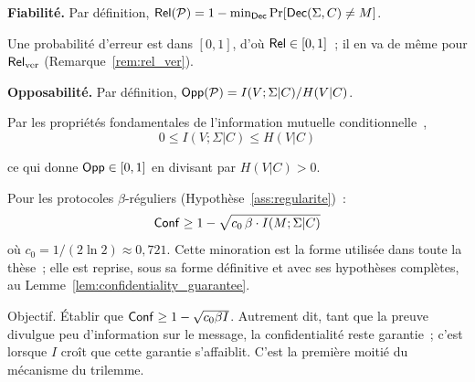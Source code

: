 \begin{sloppypar}
\begin{Preuve}
\textbf{Fiabilit\'e.}
Par d\'efinition, $\mathsf{Rel}(\mathcal{P}) = 1 - \min_{\mathsf{Dec}} \Pr[\mathsf{Dec}(\Sigma,C) \neq M]$.

Une probabilit\'e d'erreur est dans $[0,1]$, d'o\`u $\mathsf{Rel} \in [0,1]$~; il en va
de m\^eme pour $\mathsf{Rel}_{\mathrm{ver}}$ (Remarque~\ref{rem:rel_ver}).

\textbf{Opposabilit\'e.}
Par d\'efinition, $\mathsf{Opp}(\mathcal{P}) = I(V;\Sigma|C)/H(V|C)$.

Par les propri\'et\'es fondamentales de l'information mutuelle
conditionnelle~\cite{CoverThomas06},
\begin{equation}
0 \leq I(V;\Sigma|C) \leq H(V|C)
\end{equation}

ce qui donne $\mathsf{Opp} \in [0,1]$ en divisant par $H(V|C) > 0$.
\end{Preuve}
\begin{lemma}\label{lem:compromis_conf_mi}
Pour les protocoles $\beta$-r\'eguliers (Hypoth\`ese~\ref{ass:regularite})~:
\begin{equation}
\mathsf{Conf} \geq 1 - \sqrt{c_0\,\beta \cdot I(M;\Sigma|C)}
\label{eq:compromis_conf_mi}
\end{equation}
o\`u $c_0 = 1/(2\ln 2) \approx 0{,}721$. Cette minoration est la forme
utilis\'ee dans toute la th\`ese~; elle est reprise, sous sa forme
d\'efinitive et avec ses hypoth\`eses compl\`etes, au
Lemme~\ref{lem:confidentiality_guarantee}.
\end{lemma}

\begin{Preuve}\label{prv:compromis_conf_mi}

\begin{cmtEtape}{Objectif.}
\'Etablir que $\mathsf{Conf} \geq 1 - \sqrt{c_0 \beta I}$. Autrement dit, tant
que la preuve divulgue peu d'information sur le message, la
confidentialit\'e reste garantie~; c'est lorsque $I$ cro\^it que cette
garantie s'affaiblit. C'est la premi\`ere moiti\'e du m\'ecanisme du
trilemme.
\end{cmtEtape}


\end{Preuve}
\end{sloppypar}
